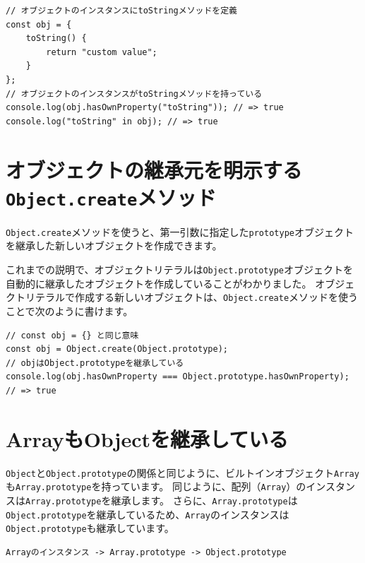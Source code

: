 \begin{lstlisting}
// オブジェクトのインスタンスにtoStringメソッドを定義
const obj = {
    toString() {
        return "custom value";
    }
};
// オブジェクトのインスタンスがtoStringメソッドを持っている
console.log(obj.hasOwnProperty("toString")); // => true
console.log("toString" in obj); // => true
\end{lstlisting}

\hypertarget{create-method}{%
\section{\texorpdfstring{オブジェクトの継承元を明示する\texttt{Object.create}メソッド}{オブジェクトの継承元を明示するObject.createメソッド}}\label{create-method}}

\texttt{Object.create}メソッドを使うと、第一引数に指定した\texttt{prototype}オブジェクトを継承した新しいオブジェクトを作成できます。

これまでの説明で、オブジェクトリテラルは\texttt{Object.prototype}オブジェクトを自動的に継承したオブジェクトを作成していることがわかりました。
オブジェクトリテラルで作成する新しいオブジェクトは、\texttt{Object.create}メソッドを使うことで次のように書けます。

\begin{lstlisting}
// const obj = {} と同じ意味
const obj = Object.create(Object.prototype);
// objはObject.prototypeを継承している
console.log(obj.hasOwnProperty === Object.prototype.hasOwnProperty); // => true
\end{lstlisting}

\hypertarget{inherit-object}{%
\section{ArrayもObjectを継承している}\label{inherit-object}}

\texttt{Object}と\texttt{Object.prototype}の関係と同じように、ビルトインオブジェクト\texttt{Array}も\texttt{Array.prototype}を持っています。
同じように、配列（\texttt{Array}）のインスタンスは\texttt{Array.prototype}を継承します。
さらに、\texttt{Array.prototype}は\texttt{Object.prototype}を継承しているため、\texttt{Array}のインスタンスは\texttt{Object.prototype}も継承しています。

\begin{lstlisting}
Arrayのインスタンス -> Array.prototype -> Object.prototype
\end{lstlisting}

